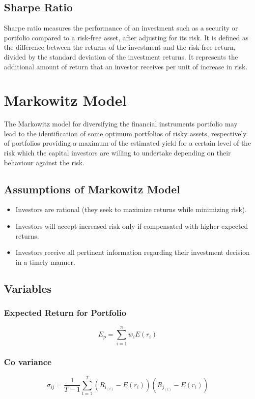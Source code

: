 \documentclass[conference]{IEEEtran}
\begin{document}
\subsection{Sharpe Ratio}
    Sharpe ratio measures the performance of an investment such as a security or portfolio compared to a risk-free asset, after adjusting for its risk. It is defined as the difference between the returns of the investment and the risk-free return, divided by the standard deviation of the investment returns. It represents the additional amount of return that an investor receives per unit of increase in risk.
    

\section{Markowitz Model}
The Markowitz model for diversifying the financial instruments portfolio may lead to the identification of some optimum portfolios of risky assets, respectively of portfolios providing a maximum of the estimated yield for a certain level of the risk which the capital investors are willing to undertake depending on their behaviour against the risk.

\subsection{Assumptions of Markowitz Model}
    \begin{itemize}
        \item Investors are rational (they seek to maximize returns while minimizing risk).
        \item Investors will accept increased risk only if compensated with higher expected returns.
        \item Investors receive all pertinent information regarding their investment decision in a timely manner.
    \end{itemize}

\subsection{Variables}
    \subsubsection{Expected Return for Portfolio}
        \[
            E_p = \sum_{i=1}^{n}
            w_i E(r_i)
        \]
    
    \subsubsection{Co variance}
        \[
            \sigma_{ij} = 
            \frac{1}{T-1}
            \sum_{t=1}^{T}
            (R_{i_{(t)}} - E(r_i)) (R_{j_{(t)}} - E(r_i))
        \]
        
\end{document}
